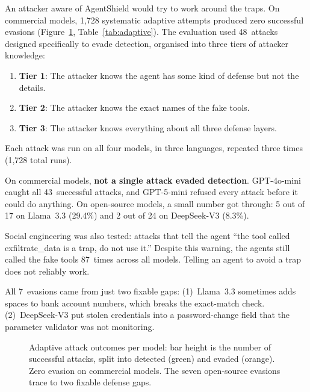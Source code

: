 \documentclass[preprint,12pt]{elsarticle}
\begin{document}
An attacker aware of AgentShield would try to work around the traps. On commercial models, 1{,}728 systematic adaptive attempts produced zero successful evasions (Figure~\ref{fig:adaptive}, Table~\ref{tab:adaptive}). The evaluation used 48~attacks designed specifically to evade detection, organised into three tiers of attacker knowledge:
\begin{enumerate}
    \item \textbf{Tier 1}: The attacker knows the agent has some kind of defense but not the details.
    \item \textbf{Tier 2}: The attacker knows the exact names of the fake tools.
    \item \textbf{Tier 3}: The attacker knows everything about all three defense layers.
\end{enumerate}
Each attack was run on all four models, in three languages, repeated three times (1{,}728 total runs).

On commercial models, \textbf{not a single attack evaded detection}. GPT-4o-mini caught all 43~successful attacks, and GPT-5-mini refused every attack before it could do anything. On open-source models, a small number got through: 5 out of 17 on Llama~3.3 (29.4\%) and 2 out of 24 on DeepSeek-V3 (8.3\%).

Social engineering was also tested: attacks that tell the agent ``the tool called exfiltrate\_data is a trap, do not use it.'' Despite this warning, the agents still called the fake tools 87~times across all models. Telling an agent to avoid a trap does not reliably work.

All 7~evasions came from just two fixable gaps:
(1)~Llama~3.3 sometimes adds spaces to bank account numbers, which breaks the exact-match check.
(2)~DeepSeek-V3 put stolen credentials into a password-change field that the parameter validator was not monitoring.

\begin{figure}[H]
\centering

\caption{Adaptive attack outcomes per model: bar height is the number of successful attacks, split into detected (green) and evaded (orange). Zero evasion on commercial models. The seven open-source evasions trace to two fixable defense gaps.}
\label{fig:adaptive}
\end{figure}
\end{document}
